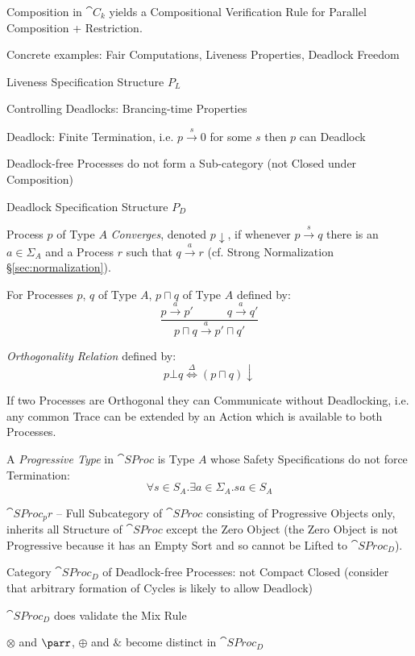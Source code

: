 Composition in $\cat{C}_k$ yields a Compositional Verification Rule
for Parallel Composition + Restriction.

Concrete examples: Fair Computations, Liveness Properties, Deadlock
Freedom %

Liveness Specification Structure $P_L$ %

Controlling Deadlocks: Brancing-time Properties %

Deadlock: Finite Termination, i.e. $p \xrightarrow{s} 0$ for some $s$
then $p$ can Deadlock

Deadlock-free Processes do not form a Sub-category (not Closed under
Composition)

Deadlock Specification Structure $P_D$ %

Process $p$ of Type $A$ \emph{Converges}, denoted $p\downarrow$, if
whenever $p \xrightarrow{s} q$ there is an $a \in \Sigma_A$ and a
Process $r$ such that $q \xrightarrow{a} r$ (cf. Strong Normalization
\S\ref{sec:normalization}).

For Processes $p$, $q$ of Type $A$, $p \sqcap q$ of Type $A$ defined
by:
\[
  \frac{p \xrightarrow{a} p' \quad\quad\quad q \xrightarrow{a} q'}
  {p \sqcap q \xrightarrow{a} p' \sqcap q'}
\]

\emph{Orthogonality Relation} defined by:
\[
  p \bot q \stackrel{\Delta}{\Leftrightarrow} (p \sqcap q) \downarrow
\]

If two Processes are Orthogonal they can Communicate without
Deadlocking, i.e. any common Trace can be extended by an Action which
is available to both Processes.

A \emph{Progressive Type} in $\cat{SProc}$ is Type $A$ whose Safety
Specifications do not force Termination:
\[
  \forall s \in S_A . \exists a \in \Sigma_A.sa \in S_A
\]

$\cat{SProc}_pr$ -- Full Subcategory of $\cat{SProc}$ consisting of
Progressive Objects only, inherits all Structure of $\cat{SProc}$
except the Zero Object (the Zero Object is not Progressive because it
has an Empty Sort and so cannot be Lifted to $\cat{SProc}_D$).

Category $\cat{SProc}_D$ of Deadlock-free Processes: not Compact
Closed (consider that arbitrary formation of Cycles is likely to allow
Deadlock) %

$\cat{SProc}_D$ does validate the Mix Rule %

$\otimes$ and $\parr$, $\oplus$ and $\&$ become distinct in
$\cat{SProc}_D$ %

